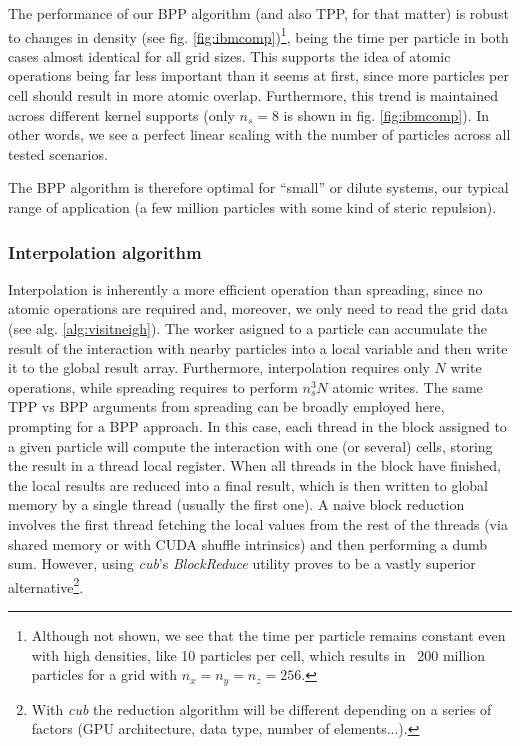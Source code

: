 \documentclass[ twoside,openright,titlepage,numbers=noenddot,%
headinclude,footinclude,cleardoublepage=empty,abstract=on,
BCOR=5mm,paper=a4,fontsize=11pt, dvipsnames
]{scrreprt}
\begin{document}
The performance of our BPP algorithm (and also TPP, for that matter) is robust to changes in density (see fig. \ref{fig:ibmcomp})\footnote{Although not shown, we see that the time per particle remains constant even with high densities, like 10 particles per cell, which results in ~200 million particles for a grid with $n_x=n_y=n_z=256$.}, being the time per particle in both cases almost identical for all grid sizes. This supports the idea of atomic operations being far less important than it seems at first, since more particles per cell should result in more atomic overlap. Furthermore, this trend is maintained across different kernel supports (only $n_s=8$ is shown in fig. \ref{fig:ibmcomp}). In other words, we see a perfect linear scaling with the number of particles across all tested scenarios.

The BPP algorithm is therefore optimal for ``small'' or dilute systems, our typical range of application (a few million particles with some kind of steric repulsion).

\subsubsection*{Interpolation algorithm}
Interpolation is inherently a more efficient operation than spreading, since no atomic operations are required and, moreover, we only need to read the grid data (see alg. \ref{alg:visitneigh}). The worker asigned to a particle can accumulate the result of the interaction with nearby particles into a local variable and then write it to the global result array. Furthermore, interpolation requires only $N$ write operations, while spreading requires to perform $n_s^3N$ atomic writes.
The same TPP vs BPP arguments from spreading can be broadly employed here, prompting for a BPP approach. In this case, each thread in the block assigned to a given particle will compute the interaction with one (or several) cells, storing the result in a thread local register.
When all threads in the block have finished, the local results are reduced into a final result, which is then written to global memory by a single thread (usually the first one).
A naive block reduction involves the first thread fetching the local values from the rest of the threads (via shared memory or with CUDA shuffle intrinsics) and then performing a dumb sum. However, using \emph{cub}'s\cite{cub} \emph{BlockReduce} utility proves to be a vastly superior alternative\footnote{With \emph{cub} the reduction algorithm will be different depending on a series of factors (GPU architecture, data type, number of elements...).}.
\end{document}
